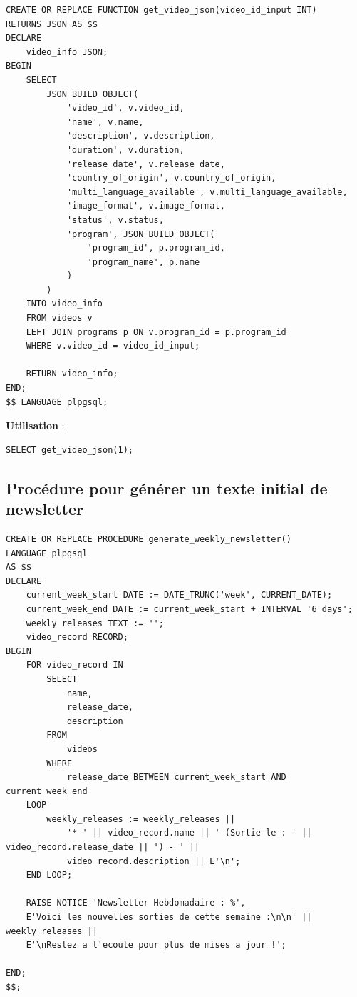 \documentclass[a4paper,12pt]{article}
\begin{document}
\begin{lstlisting}
CREATE OR REPLACE FUNCTION get_video_json(video_id_input INT)
RETURNS JSON AS $$
DECLARE
    video_info JSON;
BEGIN
    SELECT 
        JSON_BUILD_OBJECT(
            'video_id', v.video_id,
            'name', v.name,
            'description', v.description,
            'duration', v.duration,
            'release_date', v.release_date,
            'country_of_origin', v.country_of_origin,
            'multi_language_available', v.multi_language_available,
            'image_format', v.image_format,
            'status', v.status,
            'program', JSON_BUILD_OBJECT(
                'program_id', p.program_id,
                'program_name', p.name
            )
        )
    INTO video_info
    FROM videos v
    LEFT JOIN programs p ON v.program_id = p.program_id
    WHERE v.video_id = video_id_input;

    RETURN video_info;
END;
$$ LANGUAGE plpgsql;
\end{lstlisting}

\textbf{Utilisation} :

\begin{lstlisting}
SELECT get_video_json(1);
\end{lstlisting}

\subsection{Procédure pour générer un texte initial de newsletter}

\begin{lstlisting}
CREATE OR REPLACE PROCEDURE generate_weekly_newsletter()
LANGUAGE plpgsql
AS $$
DECLARE
    current_week_start DATE := DATE_TRUNC('week', CURRENT_DATE);
    current_week_end DATE := current_week_start + INTERVAL '6 days';
    weekly_releases TEXT := '';
    video_record RECORD;
BEGIN
    FOR video_record IN 
        SELECT 
            name, 
            release_date, 
            description 
        FROM 
            videos 
        WHERE 
            release_date BETWEEN current_week_start AND current_week_end
    LOOP
        weekly_releases := weekly_releases || 
            '* ' || video_record.name || ' (Sortie le : ' || video_record.release_date || ') - ' || 
            video_record.description || E'\n';
    END LOOP;

    RAISE NOTICE 'Newsletter Hebdomadaire : %', 
    E'Voici les nouvelles sorties de cette semaine :\n\n' || weekly_releases || 
    E'\nRestez a l'ecoute pour plus de mises a jour !';

END;
$$;
\end{lstlisting}
\end{document}
